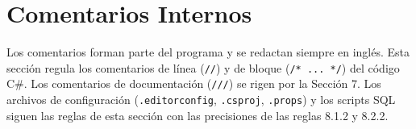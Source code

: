 \section{Comentarios Internos}

Los comentarios forman parte del programa y se redactan siempre en inglés. Esta sección regula los comentarios de línea (\texttt{//}) y de bloque (\texttt{/* ... */}) del código C\#. Los comentarios de documentación (\texttt{///}) se rigen por la Sección 7. Los archivos de configuración (\texttt{.editorconfig}, \texttt{.csproj}, \texttt{.props}) y los scripts SQL siguen las reglas de esta sección con las precisiones de las reglas 8.1.2 y 8.2.2.




